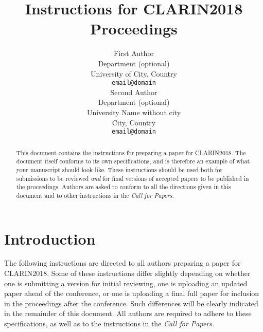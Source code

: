 \documentclass{clarin}
\title{Instructions for CLARIN2018 Proceedings}
\author{First Author \\
    Department (optional)\\
    University of City, Country \\
    {\tt email@domain} \\
    \And %
    Second Author \\
    Department (optional)\\
    University Name without city \\
    City, Country \\
    {\tt email@domain} \\
}
\begin{document}
\maketitle
\begin{abstract}
  This document contains the instructions for preparing a paper for CLARIN2018.
  The document itself
  conforms to its own specifications, and is therefore an example of
  what your manuscript should look like. These instructions should be
  used both for submissions to be reviewed \emph{and} for final versions of
  accepted papers to be published in the proceedings.
  Authors are asked to conform to all the directions
  given in this document and to other instructions in the \emph{Call for Papers}.
\end{abstract}

\section{Introduction} \label{intro}

%

The following instructions are directed to all authors preparing a paper
for CLARIN2018.
Some of these instructions differ slightly depending on whether one is submitting
a version for initial reviewing, one is uploading an updated paper ahead of the conference, or one is uploading a final full paper for inclusion in the proceedings after the conference.
Such differences will be clearly indicated in the remainder of this document.
All authors are required to adhere to these specifications,
as well as to the instructions in the \emph{Call for Papers}.
\end{document}
